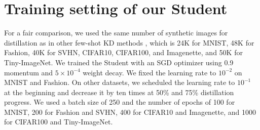 \section{Training setting of our Student}
\begin{foldable}
    For a fair comparison, we used the same number of synthetic images for distillation as in other few-shot KD methods \cite{kimura2018fewshot,wang2020neural,nguyen2022black}, which is 24K for MNIST, 48K for Fashion, 40K for SVHN, CIFAR10, CIFAR100, and Imagenette, and 50K for Tiny-ImageNet.
    We trained the Student with an SGD optimizer using 0.9 momentum and $5\times10^{-4}$ weight decay.
    We fixed the learning rate to $10^{-2}$ on MNIST and Fashion.
    On other datasets, we scheduled the learning rate to $10^{-1}$ at the beginning and decrease it by ten times at 50\% and 75\% distillation progress.
    We used a batch size of 250 and the number of epochs of 100 for MNIST, 200 for Fashion and SVHN, 400 for CIFAR10 and Imagenette, and 1000 for CIFAR100 and Tiny-ImageNet.
\end{foldable}
